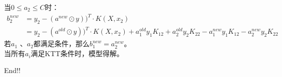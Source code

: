 \documentclass[12pt, a4paper, oneside]{ctexart}
\begin{document}
当$0 \leq a_2 \leq C$时：
\begin{align*}
    b_2^{new} &= y_2 - (a^{new} \odot y))^T \cdot K(X, x_2) \\
    &= y_2 - (a^{old} \odot y))^T \cdot K(X, x_2) + a_1^{old}y_1K_{12} + a_2^{old}y_2K_{22} - a_1^{new}y_1K_{12} - a_2^{new}y_2K_{22}
\end{align*}
若$a_1$ 、$a_2$都满足条件，那么$b_1^{new} = a_2^{new}$。\\
当所有$a_i$满足KTT条件时，模型得解。

End!!
\end{document}

